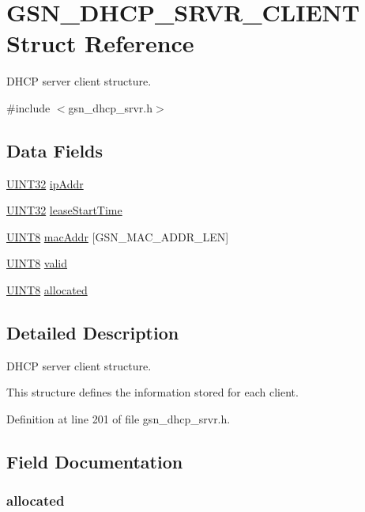 \hypertarget{a00045}{
\section{GSN\_\-DHCP\_\-SRVR\_\-CLIENT Struct Reference}
\label{a00045}
}


DHCP server client structure.  




{\ttfamily \#include $<$gsn\_\-dhcp\_\-srvr.h$>$}

\subsection*{Data Fields}
\begin{DoxyCompactItemize}
\item 
\hyperlink{a00660_gae1e6edbbc26d6fbc71a90190d0266018}{UINT32} \hyperlink{a00045_a48e99cad0feadbd616a0cda7d9628826}{ipAddr}
\item 
\hyperlink{a00660_gae1e6edbbc26d6fbc71a90190d0266018}{UINT32} \hyperlink{a00045_a4de829383750c189b8e50b611b831e23}{leaseStartTime}
\item 
\hyperlink{a00660_gab27e9918b538ce9d8ca692479b375b6a}{UINT8} \hyperlink{a00045_a6512d982e0937ad5254ef8aba102e15d}{macAddr} \mbox{[}GSN\_\-MAC\_\-ADDR\_\-LEN\mbox{]}
\item 
\hyperlink{a00660_gab27e9918b538ce9d8ca692479b375b6a}{UINT8} \hyperlink{a00045_a48e686c4b5c33a687c40091bb69ae180}{valid}
\item 
\hyperlink{a00660_gab27e9918b538ce9d8ca692479b375b6a}{UINT8} \hyperlink{a00045_a67e3fa6d7f75bde7972349a141e0bea2}{allocated}
\end{DoxyCompactItemize}


\subsection{Detailed Description}
DHCP server client structure. 

This structure defines the information stored for each client. 

Definition at line 201 of file gsn\_\-dhcp\_\-srvr.h.



\subsection{Field Documentation}
\hypertarget{a00045_a67e3fa6d7f75bde7972349a141e0bea2}{
\subsubsection[{allocated}]{ {\bf allocated}}}
\label{a00045_a67e3fa6d7f75bde7972349a141e0bea2}


